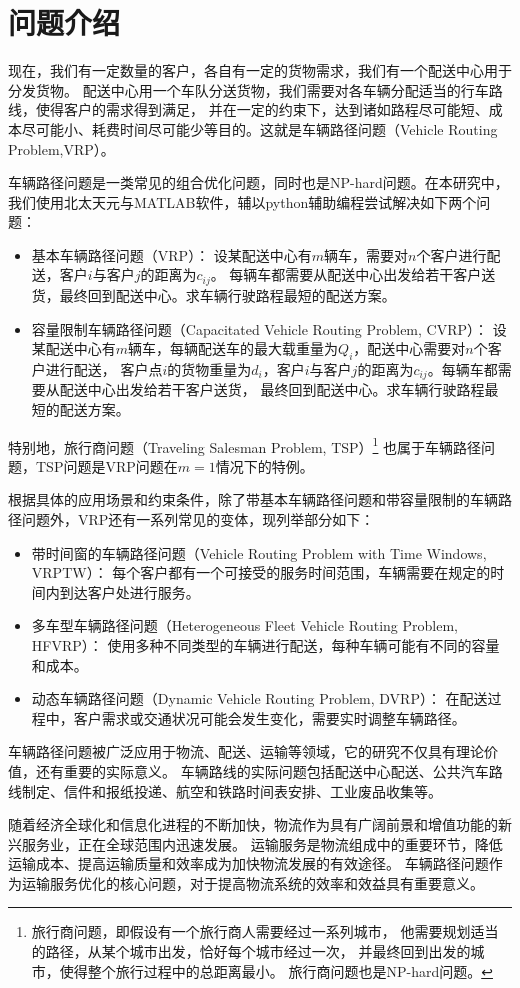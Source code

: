 \section{问题介绍}
现在，我们有一定数量的客户，各自有一定的货物需求，我们有一个配送中心用于分发货物。
配送中心用一个车队分送货物，我们需要对各车辆分配适当的行车路线，使得客户的需求得到满足，
并在一定的约束下，达到诸如路程尽可能短、成本尽可能小、耗费时间尽可能少等目的。这就是车辆路径问题（Vehicle Routing Problem,VRP）。

车辆路径问题是一类常见的组合优化问题，同时也是NP-hard问题。在本研究中，我们使用北太天元与MATLAB软件，辅以python辅助编程尝试解决如下两个问题：

\begin{itemize}
    \item 基本车辆路径问题（VRP）：
    设某配送中心有$m$辆车，需要对$n$个客户进行配送，客户$i$与客户$j$的距离为$c_{ij}$。
    每辆车都需要从配送中心出发给若干客户送货，最终回到配送中心。求车辆行驶路程最短的配送方案。
    \item 容量限制车辆路径问题（Capacitated Vehicle Routing Problem, CVRP）：
    设某配送中心有$m$辆车，每辆配送车的最大载重量为$Q_i$，配送中心需要对$n$个客户进行配送，
    客户点$i$的货物重量为$d_i$，客户$i$与客户$j$的距离为$c_{ij}$。每辆车都需要从配送中心出发给若干客户送货，
    最终回到配送中心。求车辆行驶路程最短的配送方案。
\end{itemize}

特别地，旅行商问题（Traveling Salesman Problem, TSP）\footnote{
    旅行商问题，即假设有一个旅行商人需要经过一系列城市，
    他需要规划适当的路径，从某个城市出发，恰好每个城市经过一次，
    并最终回到出发的城市，使得整个旅行过程中的总距离最小。
    旅行商问题也是NP-hard问题。
}
也属于车辆路径问题，TSP问题是VRP问题在$m=1$情况下的特例。

根据具体的应用场景和约束条件，除了带基本车辆路径问题和带容量限制的车辆路径问题外，VRP还有一系列常见的变体，现列举部分如下：

\begin{itemize}
    \item 带时间窗的车辆路径问题（Vehicle Routing Problem with Time Windows, VRPTW）：
    每个客户都有一个可接受的服务时间范围，车辆需要在规定的时间内到达客户处进行服务。
    \item 多车型车辆路径问题（Heterogeneous Fleet Vehicle Routing Problem, HFVRP）：
    使用多种不同类型的车辆进行配送，每种车辆可能有不同的容量和成本。
    \item 动态车辆路径问题（Dynamic Vehicle Routing Problem, DVRP）：
    在配送过程中，客户需求或交通状况可能会发生变化，需要实时调整车辆路径。
\end{itemize}

车辆路径问题被广泛应用于物流、配送、运输等领域，它的研究不仅具有理论价值，还有重要的实际意义。
车辆路线的实际问题包括配送中心配送、公共汽车路线制定、信件和报纸投递、航空和铁路时间表安排、工业废品收集等。 

随着经济全球化和信息化进程的不断加快，物流作为具有广阔前景和增值功能的新兴服务业，正在全球范围内迅速发展。
运输服务是物流组成中的重要环节，降低运输成本、提高运输质量和效率成为加快物流发展的有效途径。
车辆路径问题作为运输服务优化的核心问题，对于提高物流系统的效率和效益具有重要意义。
